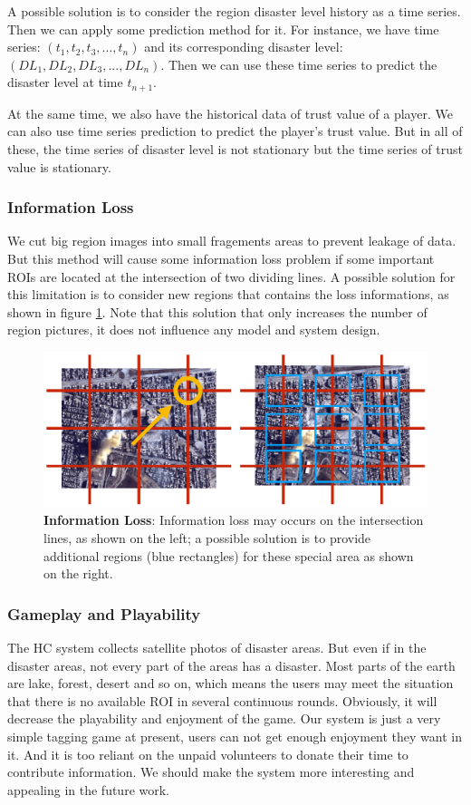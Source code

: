 A possible solution is to consider the region disaster level history as a time series. Then we can apply
some prediction method for it. For instance, we have time series: $(t_1, t_2, t_3, ..., t_n)$
and its corresponding disaster level: $(DL_1, DL_2, DL_3, ..., DL_n)$.
Then we can use these time series to predict the disaster level at time $t_{n+1}$.

At the same time, we also have the historical data of trust value of a player. We can also
use time series prediction to predict the player's trust value. But in all of these, the time series
of disaster level is not stationary but the time series of trust value is stationary.

\subsubsection{Information Loss}
We cut big region images into small fragements areas to prevent leakage of data. 
But this method will cause some information loss problem if some important ROIs are 
located at the intersection of two dividing lines.
A possible solution for this limitation is to consider new regions that contains the loss
informations, as shown in figure \ref{fig:information_loss}. Note that this solution that
only increases the number of region pictures, it does not influence any model and system design.

\begin{figure}[htp]
\centering
\includegraphics[width=0.7\columnwidth]{figures/information_loss2}
\caption{\textbf{Information Loss}: Information loss may occurs on the intersection lines, as shown on the left; a possible solution
is to provide additional regions (blue rectangles) for these special area as shown on the right.}
\label{fig:information_loss}
\end{figure}

\subsubsection{Gameplay and Playability}

The HC system collects satellite photos of disaster areas. But even if in the disaster areas, 
not every part of the areas has a disaster. Most parts of the earth are lake, forest, 
desert and so on, which means the users may meet the situation that there is no available 
ROI in several continuous rounds. Obviously, it will decrease the playability and enjoyment of the game.
Our system is just a very simple tagging game at present, users can not get enough enjoyment they want in it. 
And it is too reliant on the unpaid volunteers to donate their time to contribute information. 
We should make the system more interesting and appealing in the future work.
